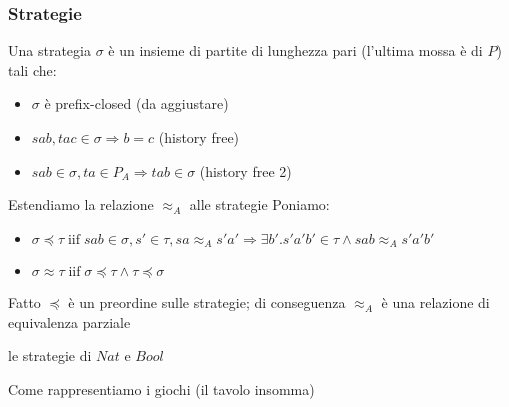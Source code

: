 \documentclass{beamer}
\begin{document}
\begin{frame}

	\frametitle{Strategie}
	
	Una strategia $\sigma$ è un insieme di partite di lunghezza pari (l'ultima mossa è di $P$) tali che:
	\begin{itemize}
	\item $\sigma$ è prefix-closed (da aggiustare)
	\item $sab , tac \in \sigma \Rightarrow b=c$ (history free)
	\item $sab\in \sigma, ta\in P_A \Rightarrow tab\in \sigma$ (history free 2)
	\end{itemize}
	
	Estendiamo la relazione $\approx_A$ alle strategie
	Poniamo:
	\begin{itemize}
	\item $\sigma \preccurlyeq \tau \; \text{iif} \; sab\in \sigma , s' \in \tau , sa \approx_A s'a' \Rightarrow \exists b' . s'a'b' \in \tau \wedge sab \approx_A s'a'b'$
	\item $\sigma \approx \tau \; \text{iif} \; \sigma \preccurlyeq \tau \wedge \tau \preccurlyeq \sigma$
	\end{itemize}

	\begin{block}{Fatto}
		$\preccurlyeq$ è un preordine sulle strategie; di conseguenza $\approx_A$ è una relazione di equivalenza parziale
	\end{block}
	
\end{frame}

\begin{frame}
	
	\begin{example}
		le strategie di $Nat$ e $Bool$
	\end{example}
	
\end{frame}

\begin{frame}
	
	Come rappresentiamo i giochi (il tavolo insomma)
	
\end{frame}
\end{document}
